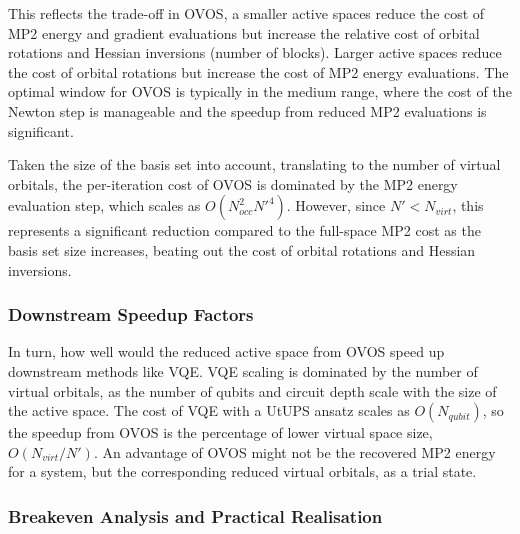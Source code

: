 This reflects the trade-off in OVOS, a smaller active spaces reduce the cost of MP2 energy and gradient evaluations but increase the relative cost of orbital rotations and Hessian inversions (number of blocks). Larger active spaces reduce the cost of orbital rotations but increase the cost of MP2 energy evaluations. The optimal window for OVOS is typically in the medium range, where the cost of the Newton step is manageable and the speedup from reduced MP2 evaluations is significant.

Taken the size of the basis set into account, translating to the number of virtual orbitals, the per-iteration cost of OVOS is dominated by the MP2 energy evaluation step, which scales as $O(N_{occ}^2 N'^4)$. However, since $N' < N_{virt}$, this represents a significant reduction compared to the full-space MP2 cost as the basis set size increases, beating out the cost of orbital rotations and Hessian inversions.

\subsubsection{Downstream Speedup Factors}
\label{subsubsec:downstream_speedup}

In turn, how well would the reduced active space from OVOS speed up downstream methods like VQE. VQE scaling is dominated by the number of virtual orbitals, as the number of qubits and circuit depth scale with the size of the active space. The cost of VQE with a UtUPS ansatz scales as $O(N_{qubit})$, so the speedup from OVOS is the percentage of lower virtual space size, $O(N_{virt}/N')$. An advantage of OVOS might not be the recovered MP2 energy for a system, but the corresponding reduced virtual orbitals, as a trial state. 

\subsubsection{Breakeven Analysis and Practical Realisation}

